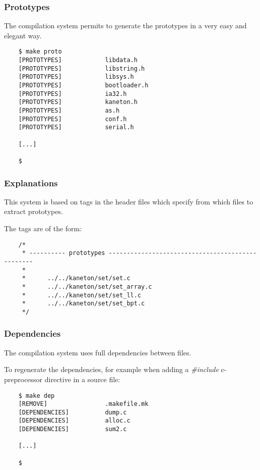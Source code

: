 
\begin{frame}[containsverbatim]
  \frametitle{Prototypes}

  The compilation system permits to generate the prototypes in a very easy
  and elegant way.

  \begin{verbatim}
    $ make proto
    [PROTOTYPES]            libdata.h
    [PROTOTYPES]            libstring.h
    [PROTOTYPES]            libsys.h
    [PROTOTYPES]            bootloader.h
    [PROTOTYPES]            ia32.h
    [PROTOTYPES]            kaneton.h
    [PROTOTYPES]            as.h
    [PROTOTYPES]            conf.h
    [PROTOTYPES]            serial.h

    [...]

    $
  \end{verbatim}
\end{frame}


\begin{frame}[containsverbatim]
  \frametitle{Explanations}

  This system is based on tags in the header files which specify
  from which files to extract prototypes.

  \nl

  The tags are of the form:

  \begin{verbatim}
    /*
     * ---------- prototypes -------------------------------------------------
     *
     *      ../../kaneton/set/set.c
     *      ../../kaneton/set/set_array.c
     *      ../../kaneton/set/set_ll.c
     *      ../../kaneton/set/set_bpt.c
     */
  \end{verbatim}
\end{frame}


\begin{frame}[containsverbatim]
  \frametitle{Dependencies}

  The compilation system uses full dependencies between files.

  \nl

  To regenerate the dependencies, for example when adding a
  \textit{\#include} c-preprocessor directive in a source file:

  \begin{verbatim}
    $ make dep
    [REMOVE]                .makefile.mk
    [DEPENDENCIES]          dump.c
    [DEPENDENCIES]          alloc.c
    [DEPENDENCIES]          sum2.c

    [...]

    $
  \end{verbatim}
\end{frame}

